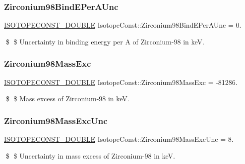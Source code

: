 \subsubsection{\texorpdfstring{Zirconium98\+Bind\+E\+Per\+A\+Unc}{Zirconium98BindEPerAUnc}}
{\footnotesize\ttfamily \mbox{\hyperlink{group___isotope_const-_macros_ga8f45a7272ce02c0b4c65c44636ed719a}{I\+S\+O\+T\+O\+P\+E\+C\+O\+N\+S\+T\+\_\+\+D\+O\+U\+B\+LE}} Isotope\+Const\+::\+Zirconium98\+Bind\+E\+Per\+A\+Unc = 0.}

\$ \$ Uncertainty in binding energy per A of Zirconium-\/98 in keV. \mbox{\label{group___isotope_const-_zirconium-_zr98_ga915a3751bcc6f759d6a0c49bf9afd00e}} 
\subsubsection{\texorpdfstring{Zirconium98\+Mass\+Exc}{Zirconium98MassExc}}
{\footnotesize\ttfamily \mbox{\hyperlink{group___isotope_const-_macros_ga8f45a7272ce02c0b4c65c44636ed719a}{I\+S\+O\+T\+O\+P\+E\+C\+O\+N\+S\+T\+\_\+\+D\+O\+U\+B\+LE}} Isotope\+Const\+::\+Zirconium98\+Mass\+Exc = -\/81286.}

\$ \$ Mass excess of Zirconium-\/98 in keV. \mbox{\label{group___isotope_const-_zirconium-_zr98_gae867725088320e5845fd8930856f1c7d}} 
\subsubsection{\texorpdfstring{Zirconium98\+Mass\+Exc\+Unc}{Zirconium98MassExcUnc}}
{\footnotesize\ttfamily \mbox{\hyperlink{group___isotope_const-_macros_ga8f45a7272ce02c0b4c65c44636ed719a}{I\+S\+O\+T\+O\+P\+E\+C\+O\+N\+S\+T\+\_\+\+D\+O\+U\+B\+LE}} Isotope\+Const\+::\+Zirconium98\+Mass\+Exc\+Unc = 8.}

\$ \$ Uncertainty in mass excess of Zirconium-\/98 in keV. \mbox{\label{group___isotope_const-_zirconium-_zr98_ga2a2c4dcb098d6e4d77ce27ebd95af96d}} 
